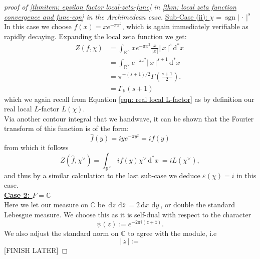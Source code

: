 \documentclass[11pt, x11names]{article}
\newcommand{\rr}{\mathbb{R}}
\newcommand{\cc}{\mathbb{C}}
\renewcommand{\bar}[1]{\overline{#1}}
\renewcommand{\brack}[1]{\left(   #1 \right)}
\newcommand{\abs}[1]{\left| \, #1  \,\right|}
\renewcommand{\hat}{\widehat}
\DeclareMathOperator{\sgn}{sgn}
\newcommand{\dx}{\, \mathrm{d}x \ }
\newcommand{\dy}{\, \mathrm{d}y \ }
\newcommand{\dz}{\, \mathrm{d}z \ }
\renewcommand{\d}[1]{\, \mathrm{d}#1 \ }
\begin{document}
\begin{proof}[proof of \ref{thmitem: epsilon factor local-zeta-func} in \ref{thm: local zeta function convergence and func-eqn} in the Archimedean case]
\underline{Sub-Case (ii): $\chi = \sgn \abs{\cdot}^s$}\\
In this case we choose $f(x) = xe^{-\pi x^2}$, which is again immediately verifiable as rapidly decaying. Expanding the local zeta function we get:
\begin{align*}
    Z(f, \chi) &= \int_{\rr^\times} x e^{-\pi x^2} \frac{x}{\abs{x}} \abs{x}^s \d{^*x}\\
    &= \int_{\rr^\times} e^{-\pi x^2} \abs{x}^{s+1} \d{^*x}\\
    &= \pi^{-(s+1)/2} \Gamma\brack{\frac{s+1}{2}}.\\
    &= \Gamma_\rr(s+1)
\end{align*}
which we again recall from Equation \ref{eqn: real local L-factor} as by definition our real local $L$-factor $L(\chi)$.\\
Via another contour integral that we handwave, it can be shown that the Fourier transform of this function is of the form:
\begin{equation*}
    \hat{f}(y) = i y e^{- \pi y^2 } = i f(y)
\end{equation*} 
from which it follows 
\begin{equation*}
    Z(\hat{f}, \chi^\lor) = \int_{\rr^\times} i f(y) \chi^\lor \d{^*x} = i L(\chi^\lor),
\end{equation*}
and thus by a similar calculation to the last sub-case we deduce $\varepsilon(\chi) = i$ in this case.\\

\textbf{\underline{Case 2: $F = \cc$}}\\
Here we let our measure on $\cc$ be $\dz \d{\bar{z}} = 2 \dx\dy$, or double the standard Lebesgue measure. We choose this as it is self-dual with respect to the character
\begin{equation*}
    \psi(z) := e^{- 2 \pi i (z + \bar{z})}.
\end{equation*} 
We also adjust the standard norm on $\cc$ to agree with the module, i.e
\begin{equation*}
    \abs{z} := 
\end{equation*}
[FINISH LATER]
\end{proof}
\end{document}
